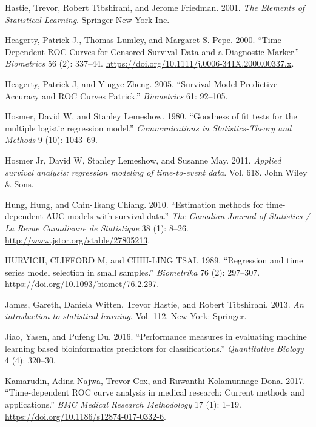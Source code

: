 \documentclass[
  letterpaper,
]{scrbook}
\newlength{\cslhangindent}
\newlength{\cslentryspacingunit} %
\newenvironment{CSLReferences}[2] %
 {%
  \setlength{\parindent}{0pt}
  \ifodd #1
  \let\oldpar\par
  \def\par{\hangindent=\cslhangindent\oldpar}
  \fi
  \setlength{\parskip}{#2\cslentryspacingunit}
 }%
 {}
\theoremstyle{plain}
\theoremstyle{definition}
\theoremstyle{remark}
\begin{document}
\begin{CSLReferences}{1}{0}
\leavevmode{}%
Hastie, Trevor, Robert Tibshirani, and Jerome Friedman. 2001. \emph{{The
Elements of Statistical Learning}}. Springer New York Inc.

\leavevmode{}%
Heagerty, Patrick J., Thomas Lumley, and Margaret S. Pepe. 2000.
{``{Time-Dependent ROC Curves for Censored Survival Data and a
Diagnostic Marker}.''} \emph{Biometrics} 56 (2): 337--44.
\url{https://doi.org/10.1111/j.0006-341X.2000.00337.x}.

\leavevmode{}%
Heagerty, Patrick J, and Yingye Zheng. 2005. {``{Survival Model
Predictive Accuracy and ROC Curves Patrick}.''} \emph{Biometrics} 61:
92--105.

\leavevmode{}%
Hosmer, David W, and Stanley Lemeshow. 1980. {``{Goodness of fit tests
for the multiple logistic regression model}.''} \emph{Communications in
Statistics-Theory and Methods} 9 (10): 1043--69.

\leavevmode{}%
Hosmer Jr, David W, Stanley Lemeshow, and Susanne May. 2011.
\emph{{Applied survival analysis: regression modeling of time-to-event
data}}. Vol. 618. John Wiley {\&} Sons.

\leavevmode{}%
Hung, Hung, and Chin-Tsang Chiang. 2010. {``{Estimation methods for
time-dependent AUC models with survival data}.''} \emph{The Canadian
Journal of Statistics / La Revue Canadienne de Statistique} 38 (1):
8--26. \url{http://www.jstor.org/stable/27805213}.

\leavevmode{}%
HURVICH, CLIFFORD M, and CHIH-LING TSAI. 1989. {``{Regression and time
series model selection in small samples}.''} \emph{Biometrika} 76 (2):
297--307. \url{https://doi.org/10.1093/biomet/76.2.297}.

\leavevmode{}%
James, Gareth, Daniela Witten, Trevor Hastie, and Robert Tibshirani.
2013. \emph{{An introduction to statistical learning}}. Vol. 112. New
York: Springer.

\leavevmode{}%
Jiao, Yasen, and Pufeng Du. 2016. {``{Performance measures in evaluating
machine learning based bioinformatics predictors for
classifications}.''} \emph{Quantitative Biology} 4 (4): 320--30.

\leavevmode{}%
Kamarudin, Adina Najwa, Trevor Cox, and Ruwanthi Kolamunnage-Dona. 2017.
{``{Time-dependent ROC curve analysis in medical research: Current
methods and applications}.''} \emph{BMC Medical Research Methodology} 17
(1): 1--19. \url{https://doi.org/10.1186/s12874-017-0332-6}.


\end{CSLReferences}
\end{document}
